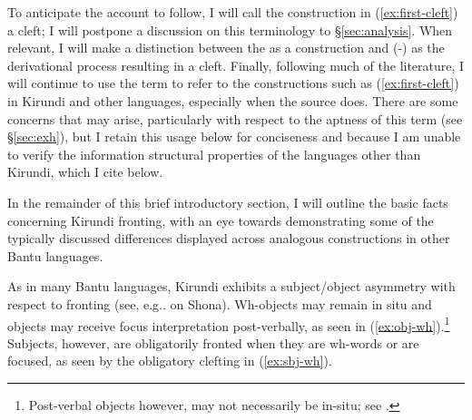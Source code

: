 \documentclass[12pt]{article}
\begin{document}
To anticipate the account to follow, I will call the construction in  (\ref{ex:first-cleft}) a cleft; I will postpone a discussion on this terminology to \S\ref{sec:analysis}. When relevant, I will make a distinction between the  as a construction and (\abar{}-) as the derivational process resulting in a cleft. Finally, following much of the literature, I will continue to use the term  to refer to the constructions such as (\ref{ex:first-cleft}) in Kirundi and other languages, especially when the source does. There are some concerns that may arise, particularly with respect to the aptness of this term (see \S\ref{sec:exh}), but I retain this usage below for conciseness and because I am unable to verify the information structural properties of the languages other than Kirundi, which I cite below. 

In the remainder of this brief introductory section, I will outline the basic facts concerning Kirundi fronting, with an eye towards demonstrating some of the typically discussed differences displayed across analogous constructions in other Bantu languages. 

\bex
\ex \label{ex:first-rep}\bxl
	 \label{ex:first-cleft}
\fxl
\fex


As in many Bantu languages, Kirundi exhibits a subject/object asymmetry with respect to fronting (see, e.g.. \citealt{zentz-2016} on Shona). Wh-objects may remain in situ and objects may receive focus interpretation post-verbally, as seen in (\ref{ex:obj-wh}).\footnote{Post-verbal objects however, may not necessarily be in-situ; see \citet{ndayiragije-1999}.} Subjects, however, are obligatorily fronted when they are wh-words or are focused, as seen by the obligatory clefting in (\ref{ex:sbj-wh}).
\end{document}
